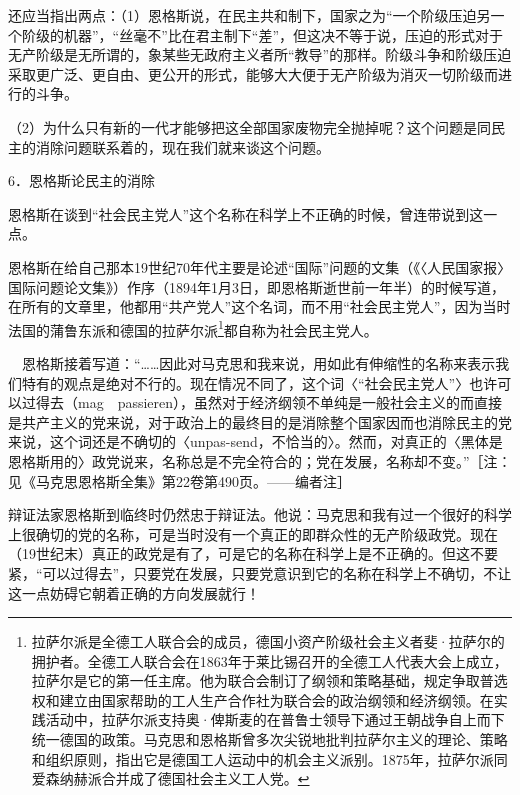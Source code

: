 \documentclass[UTF8, 12pt, a4paper]{ctexrep}
\begin{document}
还应当指出两点：（1）恩格斯说，在民主共和制下，国家之为“一个阶级压迫另一个阶级的机器”，“丝毫不”比在君主制下“差”，但这决不等于说，压迫的形式对于无产阶级是无所谓的，象某些无政府主义者所“教导”的那样。阶级斗争和阶级压迫采取更广泛、更自由、更公开的形式，能够大大便于无产阶级为消灭一切阶级而进行的斗争。

（2）为什么只有新的一代才能够把这全部国家废物完全抛掉呢？这个问题是同民主的消除问题联系着的，现在我们就来谈这个问题。

6．恩格斯论民主的消除

恩格斯在谈到“社会民主党人”这个名称在科学上不正确的时候，曾连带说到这一点。

恩格斯在给自己那本19世纪70年代主要是论述“国际”问题的文集（《〈人民国家报〉国际问题论文集》）作序（1894年1月3日，即恩格斯逝世前一年半）的时候写道，在所有的文章里，他都用“共产党人”这个名词，而不用“社会民主党人”，因为当时法国的蒲鲁东派和德国的拉萨尔派\footnote{拉萨尔派是全德工人联合会的成员，德国小资产阶级社会主义者斐·拉萨尔的拥护者。全德工人联合会在1863年于莱比锡召开的全德工人代表大会上成立，拉萨尔是它的第一任主席。他为联合会制订了纲领和策略基础，规定争取普选权和建立由国家帮助的工人生产合作社为联合会的政治纲领和经济纲领。在实践活动中，拉萨尔派支持奥·俾斯麦的在普鲁士领导下通过王朝战争自上而下统一德国的政策。马克思和恩格斯曾多次尖锐地批判拉萨尔主义的理论、策略和组织原则，指出它是德国工人运动中的机会主义派别。1875年，拉萨尔派同爱森纳赫派合并成了德国社会主义工人党。}都自称为社会民主党人。

　恩格斯接着写道：“……因此对马克思和我来说，用如此有伸缩性的名称来表示我们特有的观点是绝对不行的。现在情况不同了，这个词〈“社会民主党人”〉也许可以过得去（mag　passieren），虽然对于经济纲领不单纯是一般社会主义的而直接是共产主义的党来说，对于政治上的最终目的是消除整个国家因而也消除民主的党来说，这个词还是不确切的〈unpas-send，不恰当的〉。然而，对真正的〈黑体是恩格斯用的〉政党说来，名称总是不完全符合的；党在发展，名称却不变。”［注：见《马克思恩格斯全集》第22卷第490页。——编者注］

辩证法家恩格斯到临终时仍然忠于辩证法。他说：马克思和我有过一个很好的科学上很确切的党的名称，可是当时没有一个真正的即群众性的无产阶级政党。现在（19世纪末）真正的政党是有了，可是它的名称在科学上是不正确的。但这不要紧，“可以过得去”，只要党在发展，只要党意识到它的名称在科学上不确切，不让这一点妨碍它朝着正确的方向发展就行！
\end{document}
